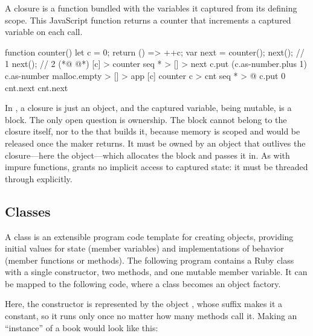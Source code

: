 A closure is a function bundled with the variables it captured
  from its defining scope.
This JavaScript function returns a counter that increments
  a captured variable on each call.

\begin{ffcode}
function counter() {
  let c = 0;
  return () => ++c;
}
var next = counter();
next(); // 1
next(); // 2
(*@ \ffcolumnbreak @*)
[c] > counter
  seq * > [] > next
    c.put (c.as-number.plus 1)
    c.as-number
malloc.empty > [] > app
  [c]
    counter c > cnt
    seq * > @
      c.put 0
      cnt.next
      cnt.next
\end{ffcode}

In \eolang{}, a closure is just an object, and the captured variable,
  being mutable, is a  block.
The only open question is ownership.
The block cannot belong to the closure  itself, nor to the
   that builds it, because \eolang{} memory is scoped and would
  be released once the maker returns.
It must be owned by an object that outlives the closure---here the 
  object---which allocates the block and passes it in.
As with impure functions, \eolang{} grants no implicit access to captured
  state: it must be threaded through explicitly.

\subsection{Classes}
\label{sec:classes}

A class is an extensible program code template for creating objects,
  providing initial values for state (member variables)
  and implementations of behavior (member functions or methods).
The following program contains a Ruby class with a single constructor,
  two methods, and one mutable member variable.
It can be mapped to the following \eolang{} code,
  where a class becomes an object factory.


Here, the constructor is represented by the object ,
  whose \ff{!} suffix makes it a constant, so it runs only once
  no matter how many methods call it.
Making an ``instance'' of a book would look like this:

